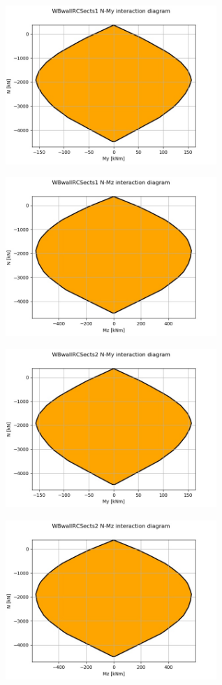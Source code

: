 
\begin{center}
\includegraphics[width=80mm]{ramp_wall/resLC/text/sections/WBwallRCSects1NMy}
\end{center}
\begin{center}
\includegraphics[width=80mm]{ramp_wall/resLC/text/sections/WBwallRCSects1NMz}
\end{center}

\begin{center}
\includegraphics[width=80mm]{ramp_wall/resLC/text/sections/WBwallRCSects2NMy}
\end{center}
\begin{center}
\includegraphics[width=80mm]{ramp_wall/resLC/text/sections/WBwallRCSects2NMz}
\end{center}
